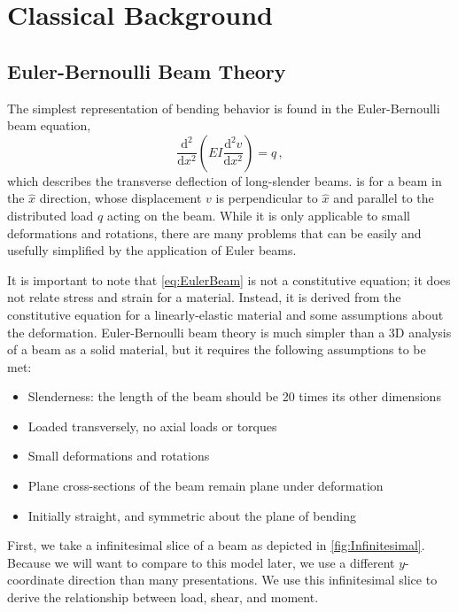 \chapter{Classical Background}
\label{ch:ClassicBack}
\section{Euler-Bernoulli Beam Theory}
%
The simplest representation of bending behavior is found in the Euler-Bernoulli beam equation, 
\begin{equation}
\label{eq:EulerBeam}
\frac{\text{d}^2}{\text{d}x^2}\left(EI\frac{\text{d}^2 v}{\text{d} x^2}\right) = q\, ,
\end{equation}
which describes the transverse deflection of long-slender beams.
 is for a beam in the $\hat{x}$ direction, whose displacement $v$ is perpendicular to $\hat{x}$ and parallel to the distributed load $q$ acting on the beam.
While it is only applicable to small deformations and rotations, there are many problems that can be easily and usefully simplified by the application of Euler beams.

It is important to note that \cref{eq:EulerBeam} is not a constitutive equation; it does not relate stress and strain for a material. 
Instead, it is derived from the constitutive equation for a linearly-elastic material and some assumptions about the deformation.
Euler-Bernoulli beam theory is much simpler than a 3D analysis of a beam as a solid material, but it requires the following assumptions to be met:
\begin{itemize}
 \item Slenderness: the length of the beam should be 20 times its other dimensions
 \item Loaded transversely, no axial loads or torques
 \item Small deformations and rotations
 \item Plane cross-sections of the beam remain plane under deformation
 \item Initially straight, and symmetric about the plane of bending
\end{itemize}
First, we take a infinitesimal slice of a beam as depicted in \cref{fig:Infinitesimal}.
Because we will want to compare to this model later, we use a different $y$-coordinate direction than many presentations.
We use this infinitesimal slice to derive the relationship between load, shear, and moment.

